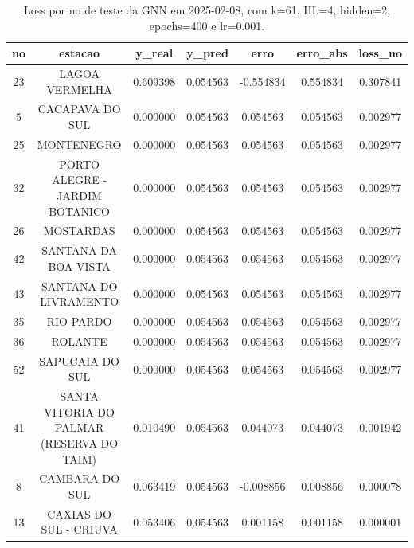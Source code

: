 \begin{table}[h]
\centering
\caption{Loss por no de teste da GNN em 2025-02-08, com k=61, HL=4, hidden=2, epochs=400 e lr=0.001.}
\label{tab:gnn_loss_k61_hl4_h2_e400_d20250208}
\begin{tabular}{ccccccc}
\toprule
no & estacao & y\_real & y\_pred & erro & erro\_abs & loss\_no \\
\midrule
23 & LAGOA VERMELHA & 0.609398 & 0.054563 & -0.554834 & 0.554834 & 0.307841 \\
5 & CACAPAVA DO SUL & 0.000000 & 0.054563 & 0.054563 & 0.054563 & 0.002977 \\
25 & MONTENEGRO & 0.000000 & 0.054563 & 0.054563 & 0.054563 & 0.002977 \\
32 & PORTO ALEGRE - JARDIM BOTANICO & 0.000000 & 0.054563 & 0.054563 & 0.054563 & 0.002977 \\
26 & MOSTARDAS & 0.000000 & 0.054563 & 0.054563 & 0.054563 & 0.002977 \\
42 & SANTANA DA BOA VISTA & 0.000000 & 0.054563 & 0.054563 & 0.054563 & 0.002977 \\
43 & SANTANA DO LIVRAMENTO & 0.000000 & 0.054563 & 0.054563 & 0.054563 & 0.002977 \\
35 & RIO PARDO & 0.000000 & 0.054563 & 0.054563 & 0.054563 & 0.002977 \\
36 & ROLANTE & 0.000000 & 0.054563 & 0.054563 & 0.054563 & 0.002977 \\
52 & SAPUCAIA DO SUL & 0.000000 & 0.054563 & 0.054563 & 0.054563 & 0.002977 \\
41 & SANTA VITORIA DO PALMAR (RESERVA DO TAIM) & 0.010490 & 0.054563 & 0.044073 & 0.044073 & 0.001942 \\
8 & CAMBARA DO SUL & 0.063419 & 0.054563 & -0.008856 & 0.008856 & 0.000078 \\
13 & CAXIAS DO SUL - CRIUVA & 0.053406 & 0.054563 & 0.001158 & 0.001158 & 0.000001 \\
\bottomrule
\end{tabular}
\end{table}
